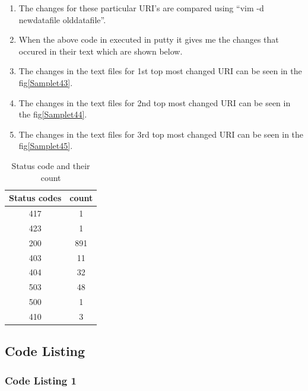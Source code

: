 \begin{enumerate}
\item The changes for these particular URI's are compared using ``vim -d newdatafile olddatafile''.
\item When the above code in executed in putty it gives me the changes that occured in their text which are shown below.
\item The changes in the text files for 1st top most changed URI can be seen in the fig\ref{Samplet43}.
\item The changes in the text files for 2nd top most changed URI can be seen in the fig\ref{Samplet44}.
\item The changes in the text files for 3rd top most changed URI can be seen in the fig\ref{Samplet45}.

\end{enumerate}
\newpage
\begin{table}
\caption{Status code and their count}
\label{q4Table1}
\begin{center}
\hspace{-2cm}
\begin{tabular}{|c|c|}
\hline
 \textbf{Status codes} & \textbf{count}\\ \hline
  417  &	1 \\ \hline
 423 &   1 \\ \hline
 200 &	891  \\ \hline
 403 &  11	  \\ \hline
404 & 32\\ \hline
503 & 48\\ \hline
500 & 1\\ \hline
410 & 3\\ \hline
\end{tabular}
\end{center}
\end{table}
\newpage



\subsection{Code Listing }
\subsubsection{Code Listing 1}

\newpage

